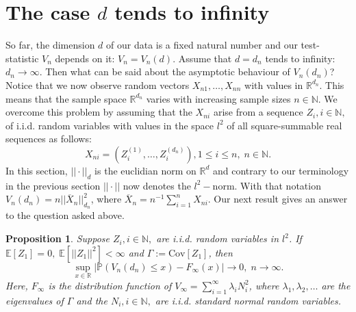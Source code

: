 \documentclass[sn-mathphys,Numbered]{sn-jnl}%
\theoremstyle{thmstyleone}%
\newtheorem{proposition}[theorem]{Proposition}%
\theoremstyle{thmstyletwo}%
\theoremstyle{thmstylethree}%
\begin{document}
\section{The case $d$ tends to infinity}
So far, the dimension $d$ of our data is a fixed natural number and our test-statistic $V_n$ depends on it: $V_n=V_n(d)$.
Assume that $d=d_n$ tends to infinity: $d_n \rightarrow \infty.$ Then what can be said about the asymptotic behaviour of
$V_n(d_n)$?
Notice that we now observe random vectors $X_{n1},\ldots,X_{nn}$ with values in $\mathbb{R}^{d_n}$. This means that the sample space $\mathbb{R}^{d_n}$ varies with increasing sample sizes $n \in \mathbb{N}$. We overcome this problem by assuming that the $X_{ni}$ arise from a sequence $Z_i, i \in \mathbb{N},$ of i.i.d. random variables with values in the space $l^2$ of all square-summable real sequences as follows:
\begin{equation} \label{arisesequence}
 X_{ni}=(Z_i^{(1)},\ldots,Z_i^{(d_n)}), 1 \le i \le n, \; n \in \mathbb{N}.
\end{equation}
In this section, $||\cdot||_d$ is the euclidian norm on $\mathbb{R}^d$ and contrary to our terminology in the previous section $||\cdot||$
now denotes the $l^2-$norm. With that notation $V_n(d_n)=n ||\overline{X}_n||^2_{d_n}$, where $\overline{X}_n = n^{-1} \sum_{i=1}^n X_{ni}$.
Our next result gives an answer to the question asked above.\\

\begin{proposition} \label{highdimensions} Suppose $Z_i, i \in \mathbb{N},$ are i.i.d. random variables in $l^2$. If $\mathbb{E}[Z_1]=0, \;\mathbb{E}[||Z_1||^2]< \infty$ and $\Gamma := \text{Cov}[Z_1]$, then
\begin{equation} \label{Vnpn}
 \sup_{x \in \mathbb{R}}|\mathbb{P}(V_n(d_n)\le x) - F_\infty(x)| \rightarrow 0, \; n \rightarrow \infty.
\end{equation}
Here, $F_\infty$ is the distribution function of $V_\infty = \sum_{i=1}^\infty \lambda_i N_i^2$, where $\lambda_1,\lambda_2,\ldots$ are the eigenvalues of $\Gamma$ and the $N_i, i \in \mathbb{N},$ are i.i.d. standard normal random variables.
\end{proposition}
\end{document}
